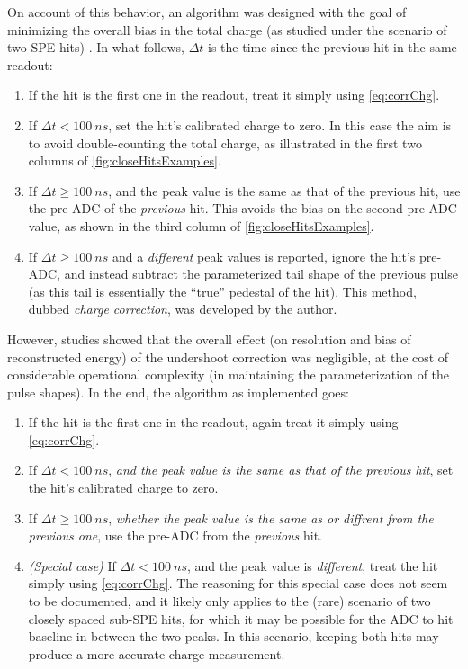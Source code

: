 \documentclass[../thesis.tex]{subfiles}
\begin{document}
On account of this behavior, an algorithm was designed with the goal of minimizing the overall bias in the total charge (as studied under the scenario of two SPE hits) \cite{closeHits}. In what follows, $\Delta t$ is the time since the previous hit in the same readout:

\begin{enumerate}
\item If the hit is the first one in the readout, treat it simply using \autoref{eq:corrChg}.
\item If $\Delta t < \SI{100}{ns}$, set the hit's calibrated charge to zero. In this case the aim is to avoid double-counting the total charge, as illustrated in the first two columns of \autoref{fig:closeHitsExamples}.
\item If $\Delta t \ge \SI{100}{ns}$, and the peak value is the same as that of the previous hit, use the pre-ADC of the \emph{previous} hit. This avoids the bias on the second pre-ADC value, as shown in the third column of \autoref{fig:closeHitsExamples}.
\item If $\Delta t \ge \SI{100}{ns}$ and a \emph{different} peak values is reported, ignore the hit's pre-ADC, and instead subtract the parameterized tail shape of the previous pulse (as this tail is essentially the ``true'' pedestal of the hit). This method, dubbed \emph{charge correction}, was developed by the author.
\end{enumerate}

However, studies showed that the overall effect (on resolution and bias of reconstructed energy) of the undershoot correction was negligible, at the cost of considerable operational complexity (in maintaining the parameterization of the pulse shapes). In the end, the algorithm as implemented goes:

\begin{enumerate}
\item If the hit is the first one in the readout, again treat it simply using \autoref{eq:corrChg}.
\item If $\Delta t < \SI{100}{ns}$, \emph{and the peak value is the same as that of the previous hit}, set the hit's calibrated charge to zero.
\item If $\Delta t \ge \SI{100}{ns}$, \emph{whether the peak value is the same as or diffrent from the previous one}, use the pre-ADC from the \emph{previous} hit.
\item \emph{(Special case)} If $\Delta t < \SI{100}{ns}$, and the peak value is \emph{different}, treat the hit simply using \autoref{eq:corrChg}. The reasoning for this special case does not seem to be documented, and it likely only applies to the (rare) scenario of two closely spaced sub-SPE hits, for which it may be possible for the ADC to hit baseline in between the two peaks. In this scenario, keeping both hits may produce a more accurate charge measurement.
\end{enumerate}
\end{document}
